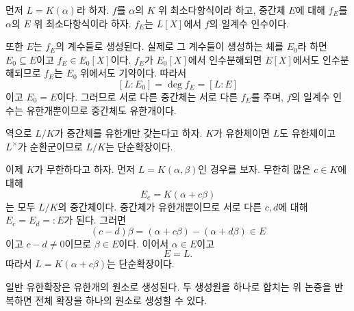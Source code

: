 \begin{solution}
먼저 $L=K(\alpha)$라 하자. $f$를 $\alpha$의 $K$ 위 최소다항식이라 하고, 중간체 $E$에 대해 $f_E$를 $\alpha$의 $E$ 위 최소다항식이라 하자. $f_E$는 $L[X]$에서 $f$의 일계수 인수이다.

또한 $E$는 $f_E$의 계수들로 생성된다. 실제로 그 계수들이 생성하는 체를 $E_0$라 하면 $E_0\subseteq E$이고 $f_E\in E_0[X]$이다. $f_E$가 $E_0[X]$에서 인수분해되면 $E[X]$에서도 인수분해되므로 $f_E$는 $E_0$ 위에서도 기약이다. 따라서
\[
  [L:E_0]=\deg f_E=[L:E]
\]
이고 $E_0=E$이다. 그러므로 서로 다른 중간체는 서로 다른 $f_E$를 주며, $f$의 일계수 인수는 유한개뿐이므로 중간체도 유한개이다.

역으로 $L/K$가 중간체를 유한개만 갖는다고 하자. $K$가 유한체이면 $L$도 유한체이고 $L^\times$가 순환군이므로 $L/K$는 단순확장이다.

이제 $K$가 무한하다고 하자. 먼저 $L=K(\alpha,\beta)$인 경우를 보자. 무한히 많은 $c\in K$에 대해
\[
  E_c=K(\alpha+c\beta)
\]
는 모두 $L/K$의 중간체이다. 중간체가 유한개뿐이므로 서로 다른 $c,d$에 대해 $E_c=E_d=:E$가 된다. 그러면
\[
  (c-d)\beta=(\alpha+c\beta)-(\alpha+d\beta)\in E
\]
이고 $c-d\ne0$이므로 $\beta\in E$이다. 이어서 $\alpha\in E$이고
\[
  E=L.
\]
따라서 $L=K(\alpha+c\beta)$는 단순확장이다.

일반 유한확장은 유한개의 원소로 생성된다. 두 생성원을 하나로 합치는 위 논증을 반복하면 전체 확장을 하나의 원소로 생성할 수 있다.
\end{solution}
